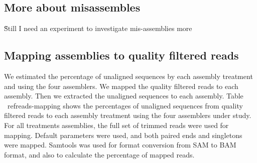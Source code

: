 

 
 \subsection*{More about misassembles}  
 
 \~Still I need an experiment to investigate mis-assemblies more
  
 \subsection*{Mapping assemblies to quality filtered reads} 

We estimated the percentage of unaligned sequences  by each assembly treatment and using the four assemblers. We mapped the quality filtered reads to each assembly. Then we extracted the unaligned sequences to each assembly. 
Table ~ref{reads-mapping} shows the percentages of unaligned sequences from quality filtered reads to each assembly treatment using the four assemblers under study.  For all treatments assemblies, the full set of trimmed reads were used for mapping. Default parameters were used, and both paired ends and singletons were mapped. 
Samtools  \cite{samtools} was used for format conversion from SAM to BAM format, and also to calculate the percentage of mapped reads.  

